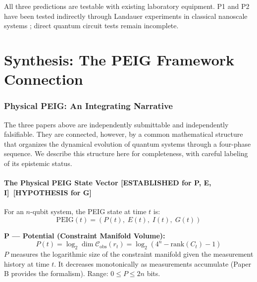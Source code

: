 \documentclass[12pt,letterpaper]{article}
\theoremstyle{plain}
\theoremstyle{definition}
\theoremstyle{remark}
\newcommand{\Cobs}{\mathcal{C}_{\mathrm{obs}}}
\newcommand{\rank}{\mathrm{rank}}
\begin{document}
All three predictions are testable with existing laboratory equipment.
P1 and P2 have been tested indirectly through Landauer experiments in
classical nanoscale systems \cite{berut2012}; direct quantum circuit tests
remain incomplete.

\newpage
\part*{Synthesis: The PEIG Framework Connection}

\section{Physical PEIG: An Integrating Narrative}
\label{sec:peig}

The three papers above are independently submittable and independently
falsifiable. They are connected, however, by a common mathematical
structure that organizes the dynamical evolution of quantum systems
through a four-phase sequence. We describe this structure here for
completeness, with careful labeling of its epistemic status.

\subsection{The Physical PEIG State Vector \textcolor{blue!70!black}{[ESTABLISHED for P, E, I]}\ \textcolor{orange!80!black}{[HYPOTHESIS for G]}}

For an $n$-qubit system, the PEIG state at time $t$ is:
\begin{equation}
  \mathrm{PEIG}(t) = (P(t),\;E(t),\;I(t),\;G(t))
  \tag{S1.1}
\end{equation}

\textbf{P --- Potential (Constraint Manifold Volume):}
\begin{equation}
  P(t) = \log_2\dim\Cobs(r_t) = \log_2(4^n - \rank(C_t) - 1)
  \tag{S1.2}
\end{equation}
$P$ measures the logarithmic size of the constraint manifold given the
measurement history at time $t$. It decreases monotonically as
measurements accumulate (Paper B provides the formalism). Range: $0 \leq P \leq 2n$ bits.
\end{document}
